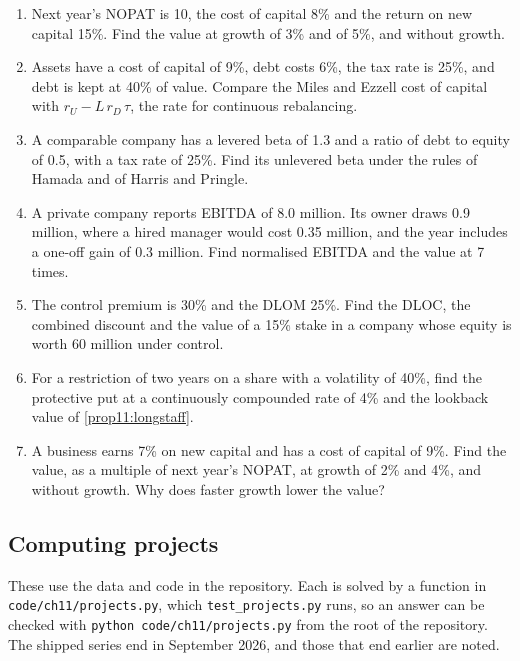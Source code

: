 \begin{chapterrefs}
\begin{enumerate}[label=\textbf{11.\arabic*}, ref=11.\arabic*, leftmargin=*]
  repaid with \cref{lem11:bridge}.
  \item\label{exr11:eight} Next year's NOPAT is 10, the cost of capital 8\% and the return on new capital
  15\%. Find the value at growth of 3\% and of 5\%, and without growth.
  \item\label{exr11:nine} Assets have a cost of capital of 9\%, debt costs 6\%, the tax rate is 25\%, and
  debt is kept at 40\% of value. Compare the Miles and Ezzell cost of capital with
  $r_U-L\,r_D\,\tau$, the rate for continuous rebalancing.
  \item\label{exr11:ten} A comparable company has a levered beta of 1.3 and a ratio of debt to equity of
  0.5, with a tax rate of 25\%. Find its unlevered beta under the rules of Hamada and of Harris and
  Pringle.
  \item\label{exr11:eleven} A private company reports EBITDA of 8.0 million. Its owner draws 0.9 million,
  where a hired manager would cost 0.35 million, and the year includes a one-off gain of 0.3 million.
  Find normalised EBITDA and the value at 7 times.
  \item\label{exr11:twelve} The control premium is 30\% and the DLOM 25\%. Find the DLOC, the combined
  discount and the value of a 15\% stake in a company whose equity is worth 60 million under control.
  \item\label{exr11:thirteen} For a restriction of two years on a share with a volatility of 40\%, find
  the protective put at a continuously compounded rate of 4\% and the lookback value of \cref{prop11:longstaff}.
  \item\label{exr11:fourteen} A business earns 7\% on new capital and has a cost of capital of 9\%. Find
  the value, as a multiple of next year's NOPAT, at growth of 2\% and 4\%, and without growth. Why does faster growth
  lower the value?
\end{enumerate}

\subsection*{Computing projects}
\label{sec11:projects}
These use the data and code in the repository. Each is solved by a function in
\texttt{code/ch11/projects.py}, which \texttt{test\_projects.py} runs, so an answer can be
checked with \texttt{python code/ch11/projects.py} from the root of the repository. The
shipped series end in September 2026, and those that end earlier are noted.


\end{chapterrefs}
